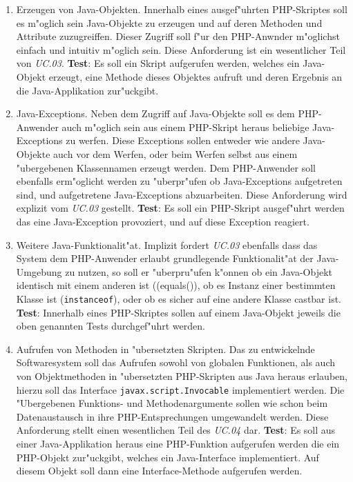 \begin{enumerate}
\item Erzeugen von Java-Objekten. Innerhalb eines ausgef"uhrten PHP-Skriptes soll es m"oglich sein Java-Objekte zu erzeugen und auf
    deren Methoden und Attribute zuzugreiffen. Dieser Zugriff soll f"ur den PHP-Anwnder m"oglichst einfach und intuitiv m"oglich sein.
    Diese Anforderung ist ein wesentlicher Teil von \emph{UC.03}.
    \textbf{Test}: Es soll ein Skript aufgerufen werden, welches ein Java-Objekt erzeugt, eine Methode dieses Objektes aufruft und
    deren Ergebnis an die Java-Applikation zur"uckgibt.

\item Java-Exceptions. Neben dem Zugriff auf Java-Objekte soll es dem PHP-Anwender auch m"oglich sein aus einem
    PHP-Skript heraus beliebige Java-Exceptions zu werfen. Diese Exceptions sollen entweder wie andere Java-Objekte auch vor dem Werfen,
    oder beim Werfen selbst aus einem "ubergebenen Klassennamen erzeugt werden. Dem PHP-Anwender soll ebenfalls erm"oglicht werden
    zu "uberpr"ufen ob Java-Exceptions aufgetreten sind, und aufgetretene Java-Exceptions abzuarbeiten.
    Diese Anforderung wird explizit vom \emph{UC.03} gestellt.
    \textbf{Test}: Es soll ein PHP-Skript ausgef"uhrt werden das eine Java-Exception provoziert, und auf diese Exception reagiert.

\item Weitere Java-Funktionalit"at. Implizit fordert \emph{UC.03} ebenfalls dass das System dem PHP-Anwender erlaubt grundlegende
    Funktionalit"at der Java-Umgebung zu nutzen, so soll er "uberpru"ufen k"onnen ob ein Java-Objekt identisch mit einem anderen ist
    (\ident(equals()), ob es Instanz einer bestimmten Klasse ist (\texttt{instanceof}), oder ob es sicher auf eine andere Klasse castbar ist.
    \textbf{Test}: Innerhalb eines PHP-Skriptes sollen auf einem Java-Objekt jeweils die oben genannten Tests durchgef"uhrt werden.

\item Aufrufen von Methoden in "ubersetzten Skripten. Das zu entwickelnde Softwaresystem soll das Aufrufen sowohl von globalen Funktionen,
    als auch von Objektmethoden in "ubersetzten PHP-Skripten aus Java heraus erlauben, hierzu soll das Interface \texttt{javax.script.Invocable} 
    implementiert werden. Die "Ubergebenen Funktions- und Methodenargumente sollen wie schon beim Datenaustausch in ihre PHP-Entsprechungen
    umgewandelt werden. Diese Anforderung stellt einen wesentlichen Teil des \emph{UC.04} dar.
    \textbf{Test}: Es soll aus einer Java-Applikation heraus eine PHP-Funktion aufgerufen werden die ein PHP-Objekt zur"uckgibt, welches
    ein Java-Interface implementiert. Auf diesem Objekt soll dann eine Interface-Methode aufgerufen werden.


\end{enumerate}
